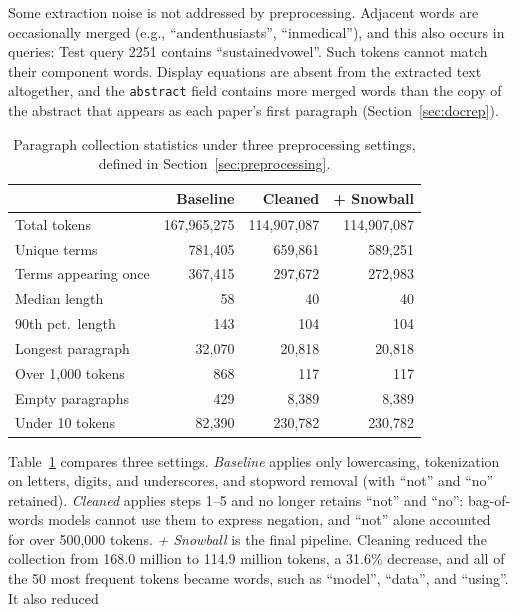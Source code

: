 \documentclass[sigconf,nonacm]{acmart}
\begin{document}
Some extraction noise is not addressed by preprocessing. Adjacent words
are occasionally merged (e.g., ``andenthusiasts'', ``inmedical''), and
this also occurs in queries: Test query 2251 contains ``sustainedvowel''.
Such tokens cannot match their component words. Display equations are
absent from the extracted text altogether, and the \texttt{abstract}
field contains more merged words than the copy of the abstract that
appears as each paper's first paragraph (Section~\ref{sec:docrep}).

\begin{table}[t]
  \caption{Paragraph collection statistics under three preprocessing
    settings, defined in Section~\ref{sec:preprocessing}.}
  \label{tab:cleaning}
  \small
  \begin{tabular}{lrrr}
    \toprule
    & Baseline & Cleaned & + Snowball \\
    \midrule
    Total tokens           & 167,965,275 & 114,907,087 & 114,907,087 \\
    Unique terms           & 781,405     & 659,861     & 589,251 \\
    Terms appearing once   & 367,415     & 297,672     & 272,983 \\
    Median length          & 58          & 40          & 40 \\
    90th pct.\ length      & 143         & 104         & 104 \\
    Longest paragraph      & 32,070      & 20,818      & 20,818 \\
    Over 1,000 tokens      & 868         & 117         & 117 \\
    Empty paragraphs       & 429         & 8,389       & 8,389 \\
    Under 10 tokens        & 82,390      & 230,782     & 230,782 \\
    \bottomrule
  \end{tabular}
\end{table}
Table~\ref{tab:cleaning} compares three settings. \emph{Baseline}
applies only lowercasing, tokenization on letters, digits, and
underscores, and stopword removal (with ``not'' and ``no'' retained).
\emph{Cleaned} applies steps 1--5 and no longer retains ``not'' and
``no'': bag-of-words models cannot use them to express negation, and
``not'' alone accounted for over 500,000 tokens. \emph{+ Snowball} is the final
pipeline. Cleaning reduced the collection from 168.0 million to 114.9
million tokens, a 31.6\% decrease, and all of the 50 most frequent tokens
became words, such as ``model'', ``data'', and ``using''. It also reduced
\end{document}
